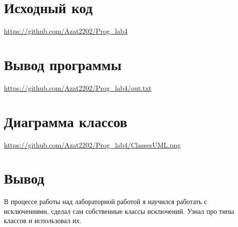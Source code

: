 \documentclass[12pt]{article}
\begin{document}
    \section{Исходный код}
    \url{ https://github.com/Azat2202/Prog_lab4}
    \newpage
    \section{Вывод программы}
    \url{ https://github.com/Azat2202/Prog_lab4/out.txt}
    \newpage
    \section{Диаграмма классов}
    \url{ https://github.com/Azat2202/Prog_lab4/ClassesUML.png}
    \newpage
    \section{Вывод}
    В процессе работы над лабораторной работой я научился работать с исключениями, сделал сам собственные классы исключений.
    Узнал про типы классов и использовал их.
\end{document}
